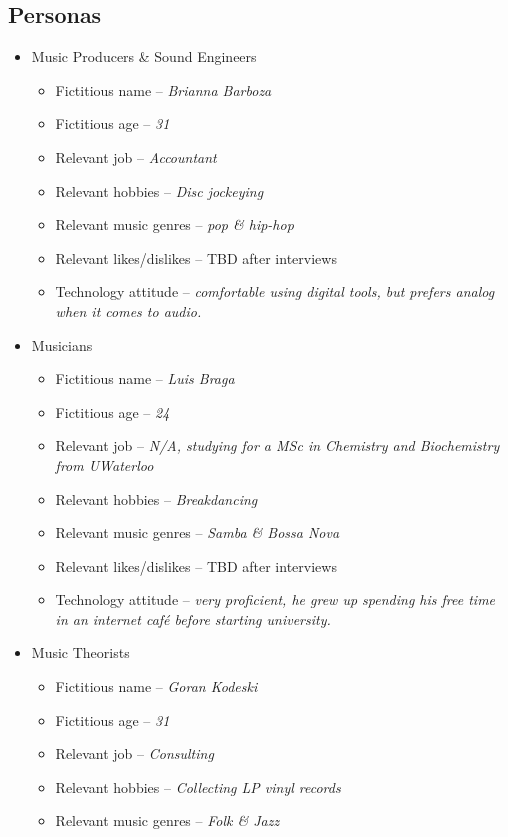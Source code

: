 \documentclass[12pt]{article}
\begin{document}
\subsection{Personas} \label{2.5-personas}
\begin{itemize}
  \item Music Producers \& Sound Engineers
  \begin{itemize}
    \item Fictitious name -- \emph{Brianna Barboza}
    \item Fictitious age -- \emph{31}
    \item Relevant job -- \emph{Accountant}
    \item Relevant hobbies -- \emph{Disc jockeying}
    \item Relevant music genres -- \emph{pop \& hip-hop}
    \item Relevant likes/dislikes -- TBD after interviews
    \item Technology attitude -- \emph{comfortable using digital tools, but prefers analog when it comes to audio.}
  \end{itemize}
  \item Musicians
  \begin{itemize}
    \item Fictitious name -- \emph{Luis Braga}
    \item Fictitious age -- \emph{24}
    \item Relevant job -- \emph{N/A, studying for a MSc in Chemistry and Biochemistry from UWaterloo}
    \item Relevant hobbies -- \emph{Breakdancing}
    \item Relevant music genres -- \emph{Samba \& Bossa Nova}
    \item Relevant likes/dislikes -- TBD after interviews
    \item Technology attitude --  \emph{very proficient, he grew up spending his free time in an internet café before starting university.}
  \end{itemize}
  \item Music Theorists
  \begin{itemize}
    \item Fictitious name -- \emph{Goran Kodeski}
    \item Fictitious age -- \emph{31}
    \item Relevant job -- \emph{Consulting}
    \item Relevant hobbies -- \emph{Collecting LP vinyl records}
    \item Relevant music genres -- \emph{Folk \& Jazz}

\end{itemize}
\end{itemize}
\end{document}
